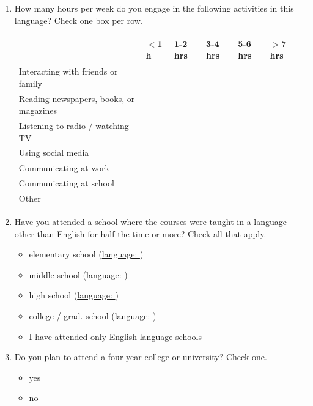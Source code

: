 \documentclass[letterpaper,10pt]{article}
\begin{document}
\begin{enumerate}[resume]
\item How many hours per week do you engage in the following activities in this language? Check one box per row.\\[-0.05in]

\renewcommand{\arraystretch}{1.5}
\begin{tabular}{|l|p{0.5in}|p{0.5in}|p{0.5in}|p{0.5in}|p{0.5in}|p{0.5in}|}
\hline
& $<$1 h&1-2 hrs&3-4 hrs&5-6 hrs&$>$7 hrs\\
\hline
Interacting with friends or family&&&&&\\
\hline
Reading newspapers, books, or magazines&&&&&\\
\hline
Listening to radio / watching TV&&&&&\\
\hline
Using social media&&&&&\\
\hline
Communicating at work&&&&&\\
\hline
Communicating at school&&&&&\\
\hline
Other \underline{\hspace{2in}}&&&&&\\
\hline
\end{tabular}



\item \label{HomeLangPostQ}Have you attended a school where the courses were taught in a language other than English for half the time or more? Check all that apply.
\begin{itemize}
	\item elementary school (\underline{language: \hspace{2in}})
	\item middle school (\underline{language: \hspace{2in}})
	\item high school (\underline{language: \hspace{2in}})
	\item college / grad. school (\underline{language: \hspace{2in}})
	\item I have attended only English-language schools
\end{itemize}


\item Do you plan to attend a four-year college or university? Check one.
\vspace{-0.1in}\begin{multicols}{2}
\begin{itemize}
	\item yes
	\item no
\end{itemize}
\end{multicols}


\end{enumerate}
\end{document}
